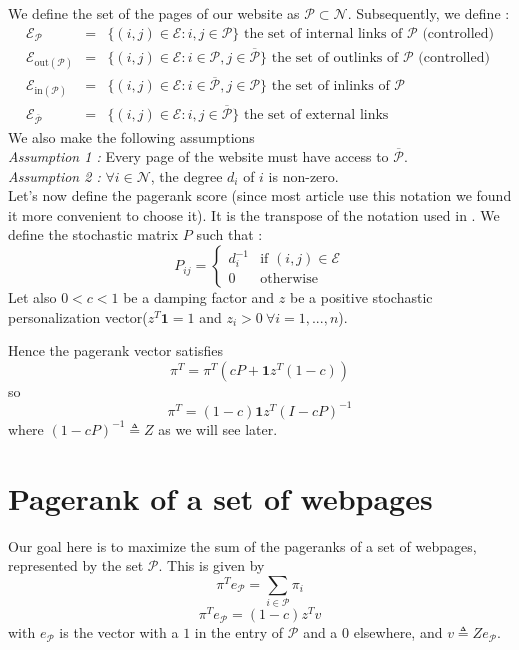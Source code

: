 \documentclass{article}
\newcommand{\1}{\mathbf{1}}
\theoremstyle{definition}
\begin{document}
We define the set of the pages of our website as  $\mathcal{P} \subset \mathcal{N}$. Subsequently, we define :
\begin{eqnarray*}
\mathcal{E}_{\mathcal{P}} & = & \{(i,j)\in \mathcal{E} : i,j \in \mathcal{P}\} \text{ the set of internal links of }\mathcal{P} \text{ (controlled)} \\
  \mathcal{E}_{\text{out}(\mathcal{P})} & = & \{(i,j)\in \mathcal{E} : i \in \mathcal{P},j \in \overline{\mathcal{P}}\} \text{ the set of outlinks of }\mathcal{P} \text{ (controlled)}\\
  \mathcal{E}_{\text{in}(\mathcal{P})} & = & \{(i,j)\in \mathcal{E} : i \in \overline{\mathcal{P}},j \in \mathcal{P}\} \text{ the set of inlinks of }\mathcal{P} \\
\mathcal{E}_{\overline{\mathcal{P}}} & = & \{(i,j)\in \mathcal{E} : i,j \in \overline{\mathcal{P}}\} \text{ the set of external links} 
\end{eqnarray*}
We also make the following assumptions\\
\textit{Assumption 1 :} Every page of the website must have access to $\overline{\mathcal{P}}$.\\
\textit{Assumption 2 :} $\forall i\in \mathcal{N}$, the degree $d_i$ of $i$ is non-zero.\\
Let's now define the pagerank score (since most article use this notation we found it more convenient to choose it). It is the transpose of the notation used in \cite{leskovec}.
We define the stochastic matrix $P$ such that :
$$ P_{ij} = \left\lbrace \begin{array}{ll}
d_i^{-1} & \text{if }(i,j)\in \mathcal{E} \\
0 & \text{otherwise}
\end{array}
\right.$$
Let also $0<c<1$ be a damping factor and $z$ be a positive stochastic personalization vector($z^T \mathbf{1} = 1$ and $z_i>0 \:\forall i = 1,...,n$).

Hence the pagerank vector satisfies
\[ \pi^T = \pi^T (cP + \1 z^T(1-c)) \]
so
\[ \pi^T = (1-c)\1 z^T(I - cP)^{-1} \]
where $(1 - cP)^{-1} \triangleq Z$ as we will see later.
\section{Pagerank of a set of webpages}
Our goal here is to maximize the sum of the pageranks of a set of webpages, represented by the set $\mathcal{P}$. This is given by
$$\pi^Te_{\mathcal{P}} = \sum_{i\in \mathcal{P}}\pi_i$$
$$\pi^Te_{\mathcal{P}} = (1-c)z^Tv$$
with $e_{\mathcal{P}}$ is the vector with a $1$ in the entry of $\mathcal{P}$ and a $0$ elsewhere, and $v \triangleq Ze_{\mathcal{P}}$.
\end{document}
